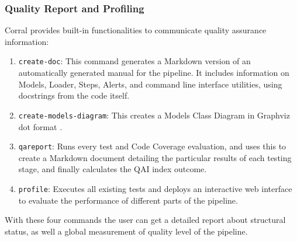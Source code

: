 \documentclass[final,5p,times,twocolumn,authoryear]{elsarticle}
\begin{document}
\subsubsection{Quality Report and Profiling}
%
Corral provides built-in functionalities to communicate quality assurance information:
\begin{enumerate}
\item   \texttt{create-doc}: This command generates a Markdown
            version of an automatically generated manual for the pipeline. It includes information on
            Models, Loader, Steps, Alerts, and command line interface
            utilities, using docstrings from the code itself.
%
\item   \texttt{create-models-diagram}: This creates a Models Class Diagram
            \citep{booch2006uml}
            in Graphviz dot format \citep{ellson2001graphviz}.
%
\item   \texttt{qareport}: Runs every test and Code Coverage evaluation,
            and uses this to create a Markdown document detailing the
            particular results of each testing stage, and finally calculates
            the QAI index outcome.
%
\item  \texttt{profile}: Executes all existing tests and deploys an interactive web interface to evaluate the performance of different parts of the pipeline.
\end{enumerate}

With these four commands the user can get a detailed report about structural
status, as well a global measurement of quality level of the pipeline.
%
\end{document}
